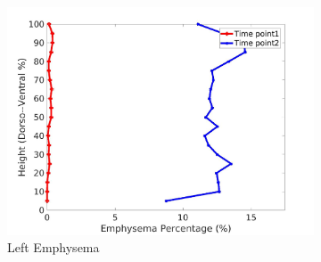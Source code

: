 \begin{figure}[H]
\begin{subfigure}{.42\linewidth}
  \includegraphics[width=\linewidth,trim={{.0\wd0} {.0\wd0} {.0\wd0} {.0\wd0}},clip]{Appendix/Image_AppexA/DorsoToVentral/IPF13LeftLungEmphysemaDiseaseDorsoToVentral.jpg} %
  \caption{Left Emphysema}
  \label{fig:IPF13DiseaseDorsoToVentral-g} 
\end{subfigure} 
\begin{subfigure}{.42\linewidth}%

\end{subfigure}
\end{figure}
